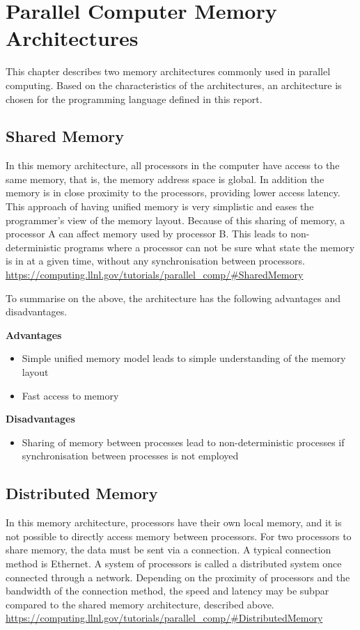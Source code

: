 \chapter{Parallel Computer Memory Architectures}

This chapter describes two memory architectures commonly used in parallel computing. Based on the characteristics of the architectures, an architecture is chosen for the programming language defined in this report.

\section{Shared Memory}

In this memory architecture, all processors in the computer have access to the same memory, that is, the memory address space is global. In addition the memory is in close proximity to the processors, providing lower access latency. This approach of having unified memory is very simplistic and eases the programmer's view of the memory layout.
Because of this sharing of memory, a processor A can affect memory used by processor B. This leads to non-deterministic programs where a processor can not be sure what state the memory is in at a given time, without any synchronisation between processors. \url{https://computing.llnl.gov/tutorials/parallel_comp/#SharedMemory}

To summarise on the above, the architecture has the following advantages and disadvantages. 

\noindent\textbf{Advantages}
\begin{itemize}
    \item Simple unified memory model leads to simple understanding of the memory layout
    \item Fast access to memory
\end{itemize}

\noindent\textbf{Disadvantages}
\begin{itemize}
    \item Sharing of memory between processes lead to non-deterministic processes if synchronisation between processes is not employed
\end{itemize}

\section{Distributed Memory}

In this memory architecture, processors have their own local memory, and it is not possible to directly access memory between processors.
For two processors to share memory, the data must be sent via a connection. A typical connection method is Ethernet. A system of processors is called a distributed system once connected through a network. Depending on the proximity of processors and the bandwidth of the connection method, the speed and latency may be subpar compared to the shared memory architecture, described above. \url{https://computing.llnl.gov/tutorials/parallel_comp/#DistributedMemory}

